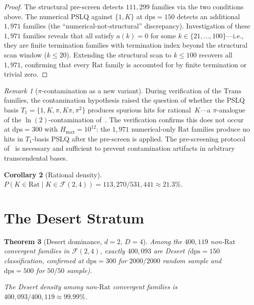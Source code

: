 \documentclass{amsart}
\newtheorem{theorem}{Theorem}[section]
\newtheorem{corollary}[theorem]{Corollary}
\theoremstyle{definition}
\theoremstyle{remark}
\newtheorem{remark}[theorem]{Remark}
\newcommand{\FF}{\mathcal{F}}
\newcommand{\Rat}{\mathrm{Rat}}
\newcommand{\Trans}{\mathrm{Trans}}
\newcommand{\dps}{\mathrm{dps}}
\begin{document}
\begin{proof}
The structural pre-screen detects $111{,}299$ families via the two
conditions above.  The numerical PSLQ against $\{1, K\}$ at $\dps = 150$
detects an additional $1{,}971$ families (the ``numerical-not-structural''
discrepancy).  Investigation of these $1{,}971$ families reveals that all
satisfy $a(k) = 0$ for some $k \in \{21, \dotsc, 100\}$---i.e., they are
finite termination families with termination index beyond the structural
scan window ($k \le 20$).  Extending the structural scan to $k \le 100$
recovers all~$1{,}971$, confirming that every $\Rat$ family is accounted
for by finite termination or trivial zero.
\end{proof}

\begin{remark}[$\pi$-contamination as a new variant]\label{rem:picontam}
During verification of the $\Trans$ families, the contamination hypothesis
raised the question of whether the PSLQ basis $T_1 = \{1, K, \pi, K\pi,
\pi^2\}$ produces spurious hits for rational~$K$---a $\pi$-analogue of the
$\ln(2)$-contamination of~\cite{contamination}.  The verification confirms
this does not occur at $\dps = 300$ with $H_{\max} = 10^{12}$: the
$1{,}971$ numerical-only $\Rat$ families produce no hits in $T_1$-basis
PSLQ after the pre-screen is applied.  The pre-screening protocol
of~\cite{contamination} is necessary and sufficient to prevent
contamination artifacts in arbitrary transcendental bases.
\end{remark}

\begin{corollary}[Rational density]\label{cor:ratdens}
$P(K \in \Rat \mid K \in \FF(2,4)) = 113{,}270 / 531{,}441 \approx 21.3\%$.
\end{corollary}

\section{The Desert Stratum}\label{sec:desert}

\begin{theorem}[Desert dominance, $d=2$, $D=4$]\label{thm:desert}
Among the $400{,}119$ non-$\Rat$ convergent families in $\FF(2,4)$,
exactly $400{,}093$ are Desert ($\dps = 150$ classification, confirmed at
$\dps = 300$ for $2000/2000$ random sample and $\dps = 500$ for $50/50$
sample).

The Desert density among non-$\Rat$ convergent families is
$400{,}093 / 400{,}119 \approx 99.99\%$.
\end{theorem}
\end{document}
